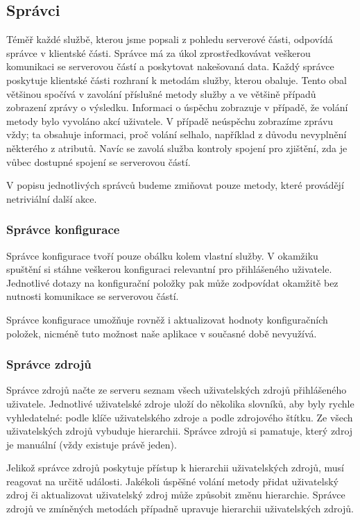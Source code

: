 \subsection{Správci}

Téměř každé službě, kterou jsme popsali z pohledu serverové části, odpovídá správce v klientské části.
Správce má za úkol zprostředkovávat veškerou komunikaci se serverovou částí a poskytovat nakešovaná data.
Každý správce poskytuje klientské části rozhraní k metodám služby, kterou obaluje.
Tento obal většinou spočívá v zavolání příslušné metody služby a ve většině případů zobrazení zprávy o výsledku.
Informaci o úspěchu zobrazuje v případě, že volání metody bylo vyvoláno akcí uživatele.
V případě neúspěchu zobrazíme zprávu vždy; ta obsahuje informaci, proč volání selhalo, například z důvodu nevyplnění některého z atributů.
Navíc se zavolá služba kontroly spojení pro zjištění, zda je vůbec dostupné spojení se serverovou částí.

V popisu jednotlivých správců budeme zmiňovat pouze metody, které provádějí netriviální další akce.

\subsubsection{Správce konfigurace}

Správce konfigurace tvoří pouze obálku kolem vlastní služby.
V okamžiku spuštění si stáhne veškerou konfiguraci relevantní pro přihlášeného uživatele.
Jednotlivé dotazy na konfigurační položky pak může zodpovídat okamžitě bez nutnosti komunikace se serverovou částí.

Správce konfigurace umožňuje rovněž i aktualizovat hodnoty konfiguračních položek, nicméně tuto možnost naše aplikace v současné době nevyužívá.

\subsubsection{Správce zdrojů}

Správce zdrojů načte ze serveru seznam všech uživatelských zdrojů přihlášeného uživatele.
Jednotlivé uživatelské zdroje uloží do několika slovníků, aby byly rychle vyhledatelné: podle klíče uživatelského zdroje a podle zdrojového štítku.
Ze všech uživatelských zdrojů vybuduje hierarchii.
Správce zdrojů si pamatuje, který zdroj je manuální (vždy existuje právě jeden).

Jelikož správce zdrojů poskytuje přístup k hierarchii uživatelských zdrojů, musí reagovat na určitě události.
Jakékoli úspěšné volání metody přidat uživatelský zdroj či aktualizovat uživatelský zdroj může způsobit změnu hierarchie.
Správce zdrojů ve zmíněných metodách případně upravuje hierarchii uživatelských zdrojů.

